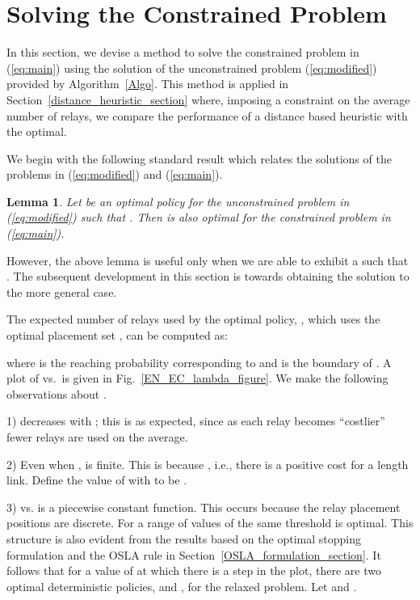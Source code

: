 \documentclass[conference]{IEEEtran}
\newtheorem{lemma}{Lemma}
\begin{document}
\section{Solving the Constrained Problem} 
\label{EN_lambda}
In this section, we devise a method to solve the constrained problem in (\ref{eq:main}) using the 
solution of the unconstrained problem (\ref{eq:modified}) provided by Algorithm~\ref{Algo}. 
This method is applied in Section~\ref{distance_heuristic_section} where, imposing a constraint
on the average number of relays, we compare the performance of
a distance based heuristic with the optimal.

We begin with the following standard result which relates the solutions
of the problems in (\ref{eq:modified}) and (\ref{eq:main}).
\begin{lemma}
\label{relation_lemma}
Let  be an optimal policy for the unconstrained problem in
(\ref{eq:modified}) such that . 
Then  is also optimal for the constrained problem in
(\ref{eq:main}).
\end{lemma}
However, the above lemma is useful only when we are able to exhibit a  such that
. The subsequent development in this section
is towards obtaining the solution to the more general case.

The expected number of relays used by the optimal policy, , which uses the optimal 
placement set , can be computed as:

where  is the reaching probability corresponding to  
and  is the boundary of .
A plot of  vs.\  is given in Fig.~\ref{EN_EC_lambda_figure}. 
We make the following observations about .

1)  decreases with ; this is as expected, since as 
each relay becomes ``costlier'' fewer relays are used on the average.

2) Even when ,  is finite. This is because 
, i.e., there is a positive cost for a  length link. Define the value of 
  with  to be .

3)  vs.  is a piecewise constant function. This occurs 
because the relay placement positions are discrete. For a range of values of  the 
same threshold is optimal. This structure is also evident from the results based on the 
optimal stopping formulation and the OSLA rule in Section~\ref{OSLA_formulation_section}. It 
follows that for a value of  at which there is a step in the plot, there are two 
optimal deterministic policies,  and , for the relaxed 
problem. Let  and 
.
\end{document}
